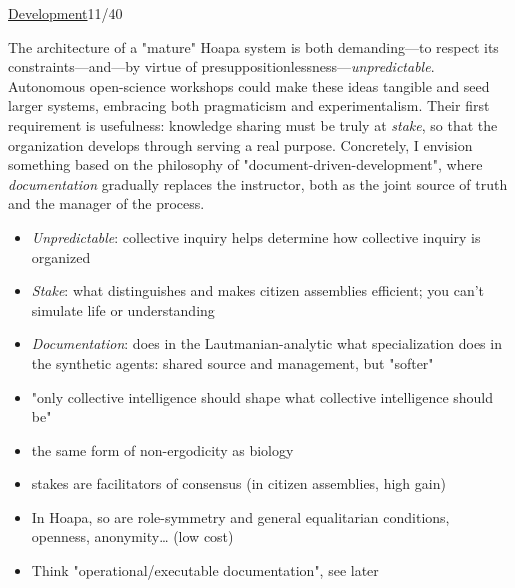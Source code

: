 \documentclass[a4paper,10pt]{article}
\newcommand{\slidehead}[2]{\par\addvspace{7pt}\noindent\underline{#1}\hfill{\color{gray}#2}\par\nopagebreak\vspace{1pt}}
\newcommand{\marked}[1]{\par\addvspace{2pt}{\bfseries #1}\par\nopagebreak}
\renewenvironment{leftbar}{%
  \def\FrameCommand{{\color{black!30}\vrule width 1.2pt}\hspace{6pt}}%
  \MakeFramed{\advance\hsize-\width \FrameRestore}}{\endMakeFramed}
\newenvironment{commentary}{\par\vspace{-2pt}\begin{leftbar}\color{black!80}}{\end{leftbar}}
\begin{document}
\slidehead{Development}{11/40}
The architecture of a "mature" Hoapa system is both demanding—to respect its constraints—and—by virtue of presuppositionlessness—\textcolor{unpredictablecyan}{\emph{unpredictable}}. Autonomous open-science workshops could make these ideas tangible and seed larger systems, embracing both pragmaticism and experimentalism. Their first requirement is usefulness: knowledge sharing must be truly at \textcolor{stakebrown}{\emph{stake}}, so that the organization develops through serving a real purpose. Concretely, I envision something based on the philosophy of "document-driven-development", where \textcolor{documentationink}{\emph{documentation}} gradually replaces the instructor, both as the joint source of truth and the manager of the process.\par
\begin{itemize}
\item \textcolor{unpredictablecyan}{\emph{Unpredictable}}: collective inquiry helps determine how collective inquiry is organized
\item \textcolor{stakebrown}{\emph{Stake}}: what distinguishes and makes citizen assemblies efficient; you can't simulate life or understanding
\item \textcolor{documentationink}{\emph{Documentation}}: does in the Lautmanian-analytic what specialization does in the synthetic agents: shared source and management, but "softer"
\end{itemize}
\begin{commentary}
\marked{\textcolor{unpredictablecyan}{Unpredictable}}
\begin{itemize}
\item "only collective intelligence should shape what collective intelligence should be"
\item the same form of non-ergodicity as biology
\end{itemize}
\marked{\textcolor{stakebrown}{Stake}}
\begin{itemize}
\item stakes are facilitators of consensus (in citizen assemblies, high gain)
\item In Hoapa, so are role-symmetry and general equalitarian conditions, openness, anonymity… (low cost)
\end{itemize}
\marked{\textcolor{documentationink}{Documentation}}
\begin{itemize}
\item Think "operational/executable documentation", see later
\end{itemize}
\end{commentary}
\end{document}
